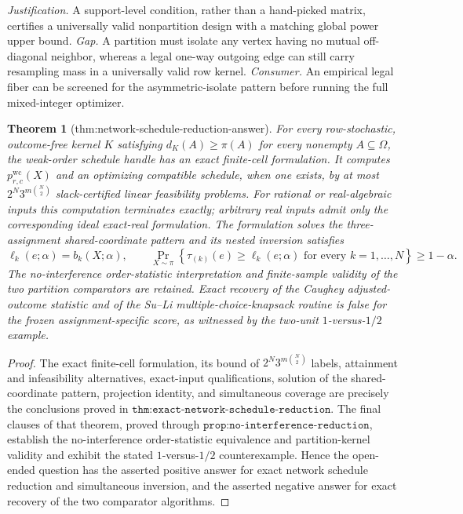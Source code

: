 \documentclass{article}
\newtheorem{theorem}{Theorem}
\begin{document}
\par\smallskip\noindent \textit{Justification.} A support-level condition, rather than a hand-picked matrix, certifies a universally valid nonpartition design with a matching global power upper bound. \textit{Gap.} A partition must isolate any vertex having no mutual off-diagonal neighbor, whereas a legal one-way outgoing edge can still carry resampling mass in a universally valid row kernel. \textit{Consumer.} An empirical legal fiber can be screened for the asymmetric-isolate pattern before running the full mixed-integer optimizer.

\begin{theorem}[thm:network-schedule-reduction-answer]\label{thm:network-schedule-reduction-answer}
For every row-stochastic, outcome-free kernel \(K\) satisfying \(d_K(A)\geq\pi(A)\) for every nonempty \(A\subseteq\Omega\), the weak-order schedule handle has an exact finite-cell formulation.  It computes \(p^{\mathrm{wc}}_{r,c}(X)\) and an optimizing compatible schedule, when one exists, by at most \(2^N3^{m\binom N2}\) slack-certified linear feasibility problems.  For rational or real-algebraic inputs this computation terminates exactly; arbitrary real inputs admit only the corresponding ideal exact-real formulation.  The formulation solves the three-assignment shared-coordinate pattern and its nested inversion satisfies
\[
 \ell_k(e;\alpha)=b_k(X;\alpha),
 \qquad
 \Pr_{X\sim\pi}\!\left\{\tau_{(k)}(e)\geq\ell_k(e;\alpha)
 \text{ for every }k=1,\ldots,N\right\}\geq1-\alpha.
\]
The no-interference order-statistic interpretation and finite-sample validity of the two partition comparators are retained.  Exact recovery of the Caughey adjusted-outcome statistic and of the Su--Li multiple-choice-knapsack routine is false for the frozen assignment-specific score, as witnessed by the two-unit \(1\)-versus-\(1/2\) example.
\end{theorem}
\begin{proof}
The exact finite-cell formulation, its bound of \(2^N3^{m\binom N2}\) labels, attainment and infeasibility alternatives, exact-input qualifications, solution of the shared-coordinate pattern, projection identity, and simultaneous coverage are precisely the conclusions proved in \(\texttt{thm:exact-network-schedule-reduction}\).  The final clauses of that theorem, proved through \(\texttt{prop:no-interference-reduction}\), establish the no-interference order-statistic equivalence and partition-kernel validity and exhibit the stated \(1\)-versus-\(1/2\) counterexample.  Hence the open-ended question has the asserted positive answer for exact network schedule reduction and simultaneous inversion, and the asserted negative answer for exact recovery of the two comparator algorithms.
\end{proof}
\end{document}
